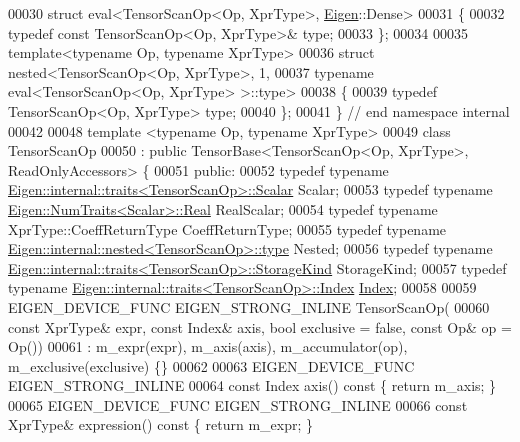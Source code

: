 \begin{DoxyCode}
00030 \textcolor{keyword}{struct }eval<TensorScanOp<Op, XprType>, \hyperlink{namespace_eigen}{Eigen}::Dense>
00031 \{
00032   \textcolor{keyword}{typedef} \textcolor{keyword}{const} TensorScanOp<Op, XprType>& type;
00033 \};
00034 
00035 \textcolor{keyword}{template}<\textcolor{keyword}{typename} Op, \textcolor{keyword}{typename} XprType>
00036 \textcolor{keyword}{struct }nested<TensorScanOp<Op, XprType>, 1,
00037             typename eval<TensorScanOp<Op, XprType> >::type>
00038 \{
00039   \textcolor{keyword}{typedef} TensorScanOp<Op, XprType> type;
00040 \};
00041 \} \textcolor{comment}{// end namespace internal}
00042 
00048 \textcolor{keyword}{template} <\textcolor{keyword}{typename} Op, \textcolor{keyword}{typename} XprType>
00049 \textcolor{keyword}{class }TensorScanOp
00050     : \textcolor{keyword}{public} TensorBase<TensorScanOp<Op, XprType>, ReadOnlyAccessors> \{
00051 \textcolor{keyword}{public}:
00052   \textcolor{keyword}{typedef} \textcolor{keyword}{typename} \hyperlink{struct_eigen_1_1internal_1_1traits}{Eigen::internal::traits<TensorScanOp>::Scalar}
       Scalar;
00053   \textcolor{keyword}{typedef} \textcolor{keyword}{typename} \hyperlink{group___sparse_core___module}{Eigen::NumTraits<Scalar>::Real} RealScalar;
00054   \textcolor{keyword}{typedef} \textcolor{keyword}{typename} XprType::CoeffReturnType CoeffReturnType;
00055   \textcolor{keyword}{typedef} \textcolor{keyword}{typename} \hyperlink{class_eigen_1_1internal_1_1_tensor_lazy_evaluator_writable}{Eigen::internal::nested<TensorScanOp>::type} 
      Nested;
00056   \textcolor{keyword}{typedef} \textcolor{keyword}{typename} \hyperlink{struct_eigen_1_1internal_1_1traits}{Eigen::internal::traits<TensorScanOp>::StorageKind}
       StorageKind;
00057   \textcolor{keyword}{typedef} \textcolor{keyword}{typename} \hyperlink{struct_eigen_1_1internal_1_1traits}{Eigen::internal::traits<TensorScanOp>::Index}
       \hyperlink{namespace_eigen_a62e77e0933482dafde8fe197d9a2cfde}{Index};
00058 
00059   EIGEN\_DEVICE\_FUNC EIGEN\_STRONG\_INLINE TensorScanOp(
00060       \textcolor{keyword}{const} XprType& expr, \textcolor{keyword}{const} Index& axis, \textcolor{keywordtype}{bool} exclusive = \textcolor{keyword}{false}, \textcolor{keyword}{const} Op& op = Op())
00061       : m\_expr(expr), m\_axis(axis), m\_accumulator(op), m\_exclusive(exclusive) \{\}
00062 
00063   EIGEN\_DEVICE\_FUNC EIGEN\_STRONG\_INLINE
00064   \textcolor{keyword}{const} Index axis()\textcolor{keyword}{ const }\{ \textcolor{keywordflow}{return} m\_axis; \}
00065   EIGEN\_DEVICE\_FUNC EIGEN\_STRONG\_INLINE
00066   \textcolor{keyword}{const} XprType& expression()\textcolor{keyword}{ const }\{ \textcolor{keywordflow}{return} m\_expr; \}

\end{DoxyCode}
